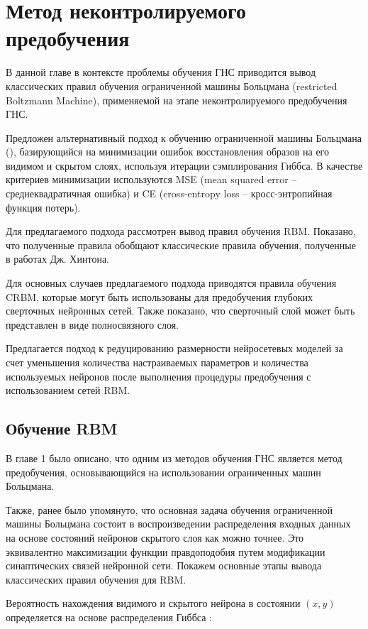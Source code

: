 \chapter{Метод неконтролируемого предобучения}

В данной главе в контексте проблемы обучения ГНС приводится вывод классических правил обучения ограниченной машины Больцмана (restricted Boltzmann Machine), применяемой на этапе неконтролируемого предобучения ГНС.

Предложен альтернативный подход к обучению ограниченной машины Больцмана (\cite{1-A, 4-A, 5-A}), базирующийся на минимизации ошибок восстановления образов на его видимом и скрытом слоях, используя итерации сэмплирования Гиббса. В качестве критериев минимизации используются MSE (mean squared error -- среднеквадратичная ошибка) и CE (cross-entropy loss -- кросс-энтропийная функция потерь). 

Для предлагаемого подхода рассмотрен вывод правил обучения RBM. Показано, что полученные правила обобщают классические правила обучения, полученные в работах Дж. Хинтона.

Для основных случаев предлагаемого подхода приводятся правила обучения CRBM, которые могут быть использованы для предобучения глубоких сверточных нейронных сетей. Также показано, что сверточный слой может быть представлен в виде полносвязного слоя.

Предлагается подход к редуцированию размерности нейросетевых моделей за счет уменьшения количества настраиваемых параметров и количества используемых нейронов после выполнения процедуры предобучения с использованием сетей RBM.

\section{Обучение RBM}

В главе 1 было описано, что одним из методов обучения ГНС является метод предобучения, основывающийся на использовании ограниченных машин Больцмана.

Также, ранее было упомянуто, что основная задача обучения ограниченной машины Больцмана состоит в воспроизведении распределения входных данных на основе состояний нейронов скрытого слоя как можно точнее. Это эквивалентно  максимизации функции правдоподобия путем модификации синаптических связей нейронной сети. Покажем основные этапы вывода классических правил обучения для RBM.

Вероятность нахождения видимого и скрытого нейрона в состоянии $(x, y)$ определяется на основе распределения Гиббса \cite{gibbs1902}:
	
